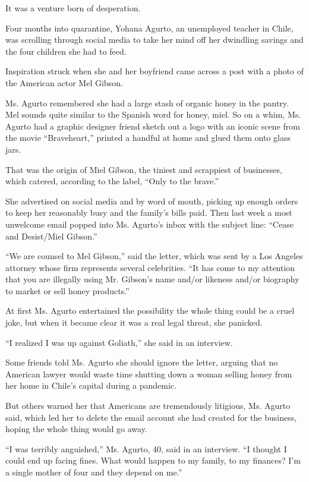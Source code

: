 It was a venture born of desperation.

Four months into quarantine, Yohana Agurto, an unemployed teacher in
Chile, was scrolling through social media to take her mind off her
dwindling savings and the four children she had to feed.

Inspiration struck when she and her boyfriend came across a post with a
photo of the American actor Mel Gibson.

Ms. Agurto remembered she had a large stash of organic honey in the
pantry. Mel sounds quite similar to the Spanish word for honey, miel. So
on a whim, Ms. Agurto had a graphic designer friend sketch out a logo
with an iconic scene from the movie ``Braveheart,'' printed a handful at
home and glued them onto glass jars.

That was the origin of Miel Gibson, the tiniest and scrappiest of
businesses, which catered, according to the label, ``Only to the
brave.''

She advertised on social media and by word of mouth, picking up enough
orders to keep her reasonably busy and the family's bills paid. Then
last week a most unwelcome email popped into Ms. Agurto's inbox with the
subject line: ``Cease and Desist/Miel Gibson.''

``We are counsel to Mel Gibson,'' said the letter, which was sent by a
Los Angeles attorney whose firm represents several celebrities. ``It has
come to my attention that you are illegally using Mr. Gibson's name
and/or likeness and/or biography to market or sell honey products.''

At first Ms. Agurto entertained the possibility the whole thing could be
a cruel joke, but when it became clear it was a real legal threat, she
panicked.

``I realized I was up against Goliath,'' she said in an interview.

Some friends told Ms. Agurto she should ignore the letter, arguing that
no American lawyer would waste time shutting down a woman selling honey
from her home in Chile's capital during a pandemic.

But others warned her that Americans are tremendously litigious, Ms.
Agurto said, which led her to delete the email account she had created
for the business, hoping the whole thing would go away.

``I was terribly anguished,'' Ms. Agurto, 40, said in an interview. ``I
thought I could end up facing fines. What would happen to my family, to
my finances? I'm a single mother of four and they depend on me.''


